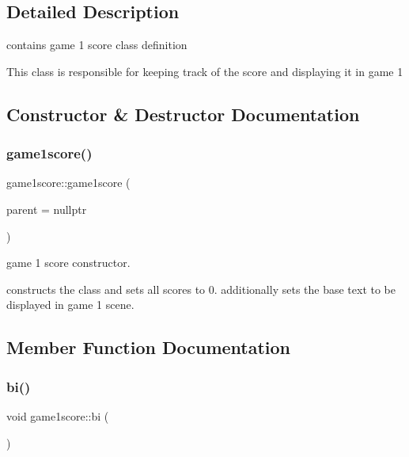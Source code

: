 \subsection{Detailed Description}
contains game 1 score class definition 

This class is responsible for keeping track of the score and displaying it in game 1 

\subsection{Constructor \& Destructor Documentation}
\mbox{\label{classgame1score_ab80521983d8a77a466dd7d7253fcd647}} 
\subsubsection{\texorpdfstring{game1score()}{game1score()}}
{\footnotesize\ttfamily game1score\+::game1score (\begin{DoxyParamCaption}\item[{Q\+Graphics\+Item $\ast$}]{parent = {\ttfamily nullptr} }\end{DoxyParamCaption})\hspace{0.3cm}{\ttfamily [explicit]}}



game 1 score constructor. 

constructs the class and sets all scores to 0. additionally sets the base text to be displayed in game 1 scene. 

\subsection{Member Function Documentation}
\mbox{\label{classgame1score_aa2aecd005fd86671e508a3b91f4251b6}} 
\subsubsection{\texorpdfstring{bi()}{bi()}}
{\footnotesize\ttfamily void game1score\+::bi (\begin{DoxyParamCaption}{ }\end{DoxyParamCaption})}



